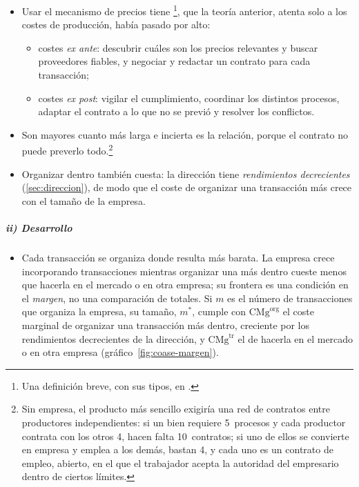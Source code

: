 \documentclass[11pt]{article}
\begin{document}
\begin{itemize}
\item Usar el mecanismo de precios tiene \footnote{Una definición breve, con sus tipos, en \textcite{Economipedia2026CostosTransaccion}.}, que la teoría anterior, atenta solo a los costes de producción, había pasado por alto\nocite{Coase1937Nature,Coase1991Institutional}:
  \begin{itemize}
  \item costes \emph{ex ante}: descubrir cuáles son los precios relevantes y buscar proveedores fiables, y negociar y redactar un contrato para cada transacción;
  \item costes \emph{ex post}: vigilar el cumplimiento, coordinar los distintos procesos, adaptar el contrato a lo que no se previó y resolver los conflictos.
  \end{itemize}
\item Son mayores cuanto más larga e incierta es la relación, porque el contrato no puede preverlo todo.\footnote{Sin empresa, el producto más sencillo exigiría una red de contratos entre productores independientes: si un bien requiere 5~procesos y cada productor contrata con los otros 4, hacen falta 10~contratos; si uno de ellos se convierte en empresa y emplea a los demás, bastan 4, y cada uno es un contrato de empleo, abierto, en el que el trabajador acepta la autoridad del empresario dentro de ciertos límites.}
\item Organizar dentro también cuesta: la dirección tiene \emph{rendimientos decrecientes} (\ref{sec:direccion}), de modo que el coste de organizar una transacción más crece con el tamaño de la empresa.
\end{itemize}

\subparagraph{ii) Desarrollo}

\begin{itemize}
\item Cada transacción se organiza donde resulta más barata. La empresa crece incorporando transacciones mientras organizar una más dentro cueste menos que hacerla en el mercado o en otra empresa; su frontera es una condición en el \emph{margen}, no una comparación de totales\nocite{Coase1937Nature}. Si $m$ es el número de transacciones que organiza la empresa, su tamaño, $m^{*}$, cumple
  con $\mathrm{CMg}^{\mathrm{org}}$ el coste marginal de organizar una transacción más dentro, creciente por los rendimientos decrecientes de la dirección, y $\mathrm{CMg}^{\mathrm{tr}}$ el de hacerla en el mercado o en otra empresa (gráfico~\ref{fig:coase-margen}).
\end{itemize}
\end{document}
